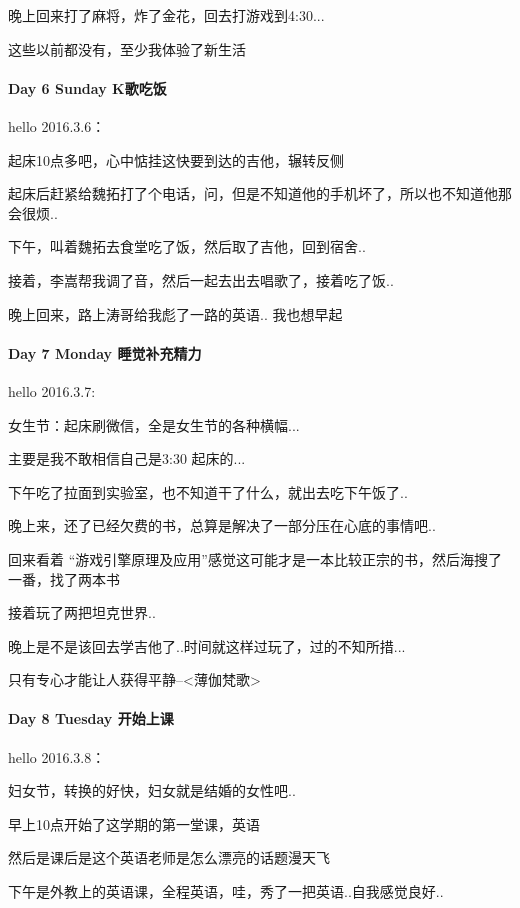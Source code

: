 \documentclass[UTF8,a4paper,8pt]{ctexbook}
\begin{document}
	 	 晚上回来打了麻将，炸了金花，回去打游戏到4:30...
	 	 
	 	 这些以前都没有，至少我体验了新生活
 	 \paragraph{Day 6   Sunday    \quad   K歌吃饭}
	 	 hello 2016.3.6：
	 	 
	 	 起床10点多吧，心中惦挂这快要到达的吉他，辗转反侧
	 	 
	 	 起床后赶紧给魏拓打了个电话，问，但是不知道他的手机坏了，所以也不知道他那会很烦..
	 	 
	 	 下午，叫着魏拓去食堂吃了饭，然后取了吉他，回到宿舍..
	 	 
	 	 接着，李嵩帮我调了音，然后一起去出去唱歌了，接着吃了饭..
	 	 
	 	 晚上回来，路上涛哥给我彪了一路的英语..  我也想早起
 	 \paragraph{Day 7   Monday    \quad   睡觉补充精力  }
	 	 hello 2016.3.7:
	 	 
	 	 女生节：起床刷微信，全是女生节的各种横幅...
	 	  
	 	 主要是我不敢相信自己是3:30 起床的...
	 	 
	 	 下午吃了拉面到实验室，也不知道干了什么，就出去吃下午饭了..
	 	 
	 	 晚上来，还了已经欠费的书，总算是解决了一部分压在心底的事情吧..
	 	 
	 	 回来看着 “游戏引擎原理及应用”感觉这可能才是一本比较正宗的书，然后海搜了一番，找了两本书
	 	 
	 	 接着玩了两把坦克世界..
	 	 
	 	 晚上是不是该回去学吉他了..时间就这样过玩了，过的不知所措...
	 	 
	 	 只有专心才能让人获得平静--<薄伽梵歌>
 	 \paragraph{Day 8   Tuesday    \quad   开始上课 }
	 	 hello 2016.3.8：
	 	 
	 	 妇女节，转换的好快，妇女就是结婚的女性吧..
	 	 
	 	 早上10点开始了这学期的第一堂课，英语
	 	 
	 	 然后是课后是这个英语老师是怎么漂亮的话题漫天飞
	 	 
	 	 下午是外教上的英语课，全程英语，哇，秀了一把英语..自我感觉良好..
	 	 
\end{document}
